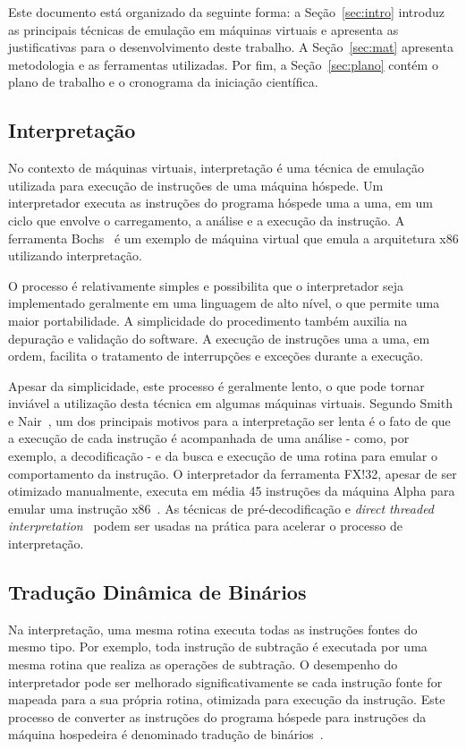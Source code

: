 \documentclass[a4paper,12pt]{article}
\begin{document}
Este documento está organizado da seguinte forma: a Seção~\ref{sec:intro}
introduz as principais técnicas de emulação em máquinas virtuais e apresenta as
justificativas para o desenvolvimento deste trabalho.  %
A Seção~\ref{sec:mat} apresenta metodologia e as ferramentas utilizadas.
Por fim, a Seção~\ref{sec:plano} contém o plano de trabalho e o cronograma da
iniciação científica. %

\subsection{Interpretação}
\label{subsec:int}
No contexto de máquinas virtuais, interpretação é uma técnica de emulação
utilizada para execução de instruções de uma máquina hóspede. Um interpretador
executa as instruções do programa hóspede uma a uma, em um ciclo que envolve o
carregamento, a análise e a execução da instrução. A ferramenta
Bochs~\cite{boch} é um exemplo de máquina virtual que emula a arquitetura x86
utilizando interpretação.

O processo é relativamente simples e possibilita que o interpretador seja
implementado geralmente em uma linguagem de alto nível, o que permite uma maior
portabilidade. A simplicidade do procedimento também auxilia na depuração e
validação do software. A execução de instruções uma a uma, em ordem, facilita o
tratamento de interrupções e exceções durante a execução.%

Apesar da simplicidade, este processo é geralmente lento, o que pode tornar
inviável a utilização desta técnica em algumas máquinas virtuais. Segundo Smith
e Nair~\cite{smith_nair_1}, um dos principais motivos para a interpretação ser
lenta é o fato de que a execução de cada instrução é acompanhada de uma análise
- como, por exemplo, a decodificação - e da busca e execução de uma rotina para
emular o comportamento da instrução. O interpretador da ferramenta FX!32, apesar
de ser otimizado manualmente, executa em média 45 instruções da máquina Alpha
para emular uma instrução x86~\cite{fx32}. As técnicas de pré-decodificação e
\emph{direct threaded interpretation}~\cite{opt_branch, klint} podem ser usadas
na prática para acelerar o processo de interpretação.

\subsection{Tradução Dinâmica de Binários}
\label{subsec:trad}
Na interpretação, uma mesma rotina executa todas as instruções fontes do mesmo
tipo. Por exemplo, toda instrução de subtração é executada por uma mesma rotina
que realiza as operações de subtração. O desempenho do interpretador pode ser
melhorado significativamente se cada instrução fonte for mapeada para a sua
própria rotina, otimizada para execução da instrução. Este processo de converter
as instruções do programa hóspede para instruções da máquina hospedeira é
denominado tradução de binários~\cite{bin_t}.
\end{document}
